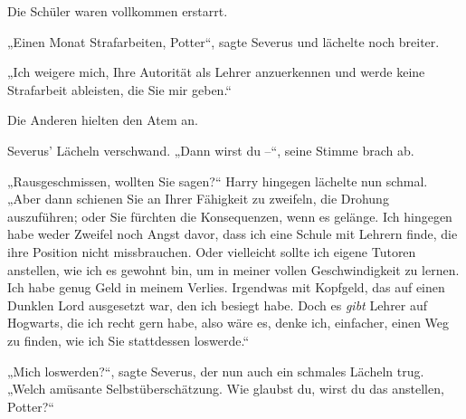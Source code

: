 Die Schüler waren vollkommen erstarrt. 

„Einen Monat Strafarbeiten, Potter“, sagte Severus und lächelte noch breiter. 

„Ich weigere mich, Ihre Autorität als Lehrer anzuerkennen und werde keine Strafarbeit ableisten, die Sie mir geben.“ 

Die Anderen hielten den Atem an. 

Severus’ Lächeln verschwand. „Dann wirst du –“, seine Stimme brach ab. 

„Rausgeschmissen, wollten Sie sagen?“ Harry hingegen lächelte nun schmal. „Aber dann schienen Sie an Ihrer Fähigkeit zu zweifeln, die Drohung auszuführen; oder Sie fürchten die Konsequenzen, wenn es gelänge. Ich hingegen habe weder Zweifel noch Angst davor, dass ich eine Schule mit Lehrern finde, die ihre Position nicht missbrauchen. Oder vielleicht sollte ich eigene Tutoren anstellen, wie ich es gewohnt bin, um in meiner vollen Geschwindigkeit zu lernen. Ich habe genug Geld in meinem Verlies. Irgendwas mit Kopfgeld, das auf einen Dunklen Lord ausgesetzt war, den ich besiegt habe. Doch es \emph{gibt} Lehrer auf Hogwarts, die ich recht gern habe, also wäre es, denke ich, einfacher, einen Weg zu finden, wie ich Sie stattdessen loswerde.“ 

„Mich loswerden?“, sagte Severus, der nun auch ein schmales Lächeln trug. „Welch amüsante Selbstüberschätzung. Wie glaubst du, wirst du das anstellen, Potter?“ 

